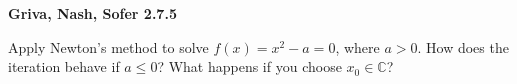 \textbf{Griva, Nash, Sofer 2.7.5}

Apply Newton's method to solve $f(x) = x^2 - a = 0$, where $a > 0$. How does the iteration behave if $a \le 0$? What
happens if you choose $x_0 \in \mathbb{C}$?

\begin{solution}
  \ \\
\end{solution}